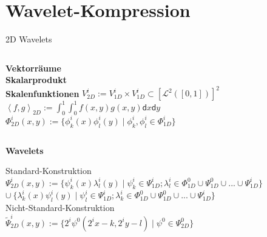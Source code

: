 \section{Wavelet-Kompression}

	\begin{frame}{2D Wavelets}
		\begin{columns}[T,onlytextwidth]
			{\bf Vektorräume}\vspace{3mm}\\
			{\bf Skalarprodukt}\vspace{3mm}\\
			{\bf Skalenfunktionen}
			\vspace{-1mm}
			$V^i_{2D}:= V^i_{1D}\times V^i_{1D}\subset\left[ \mathcal{L}^2([0,1])\right]^2$\vspace{3mm}\\
			$\left\langle f, g\right\rangle _{2D}:=\int_{0}^{1}\int_{0}^{1}f(x,y)g(x,y)\mathsf{d}x\mathsf{d}y$\vspace{3mm}\\
			$\Phi^i_{2D}(x, y):=\{\phi^i_k(x)\phi^i_l(y)\mid \phi^i_k, \phi^i_l\in\Phi^i_{1D} \}$
		\end{columns}\vspace{3mm}\pause
		\begin{center}
				\bf Wavelets\vspace{-5mm}
		\end{center}
		\alert{Standard-Konstruktion}\vspace{1mm}\\
		\hspace{6mm}$\Psi^i_{2D}(x, y):=\{\psi^i_k(x)\lambda^i_l(y)\mid \psi^i_k\in\Psi_{1D}^{i};\lambda^i_l\in\Phi_{1D}^0\cup\Psi_{1D}^0\cup...\cup\Psi_{1D}^{i} \}$\\
		\hspace{23mm}$\cup\ \{\lambda^i_k(x)\psi^i_l(y)\mid \psi^i_l\in\Psi_{1D}^{i};\lambda^i_k\in\Phi_{1D}^0\cup\Psi_{1D}^0\cup...\cup\Psi_{1D}^{i} \}$\vspace{3mm}\\ \pause
		\alert{Nicht-Standard-Konstruktion}\vspace{1mm}\\
		\hspace{6mm}$\tilde\Psi^i_{2D}(x, y):=\{2^i\psi^0(2^ix-k, 2^iy-l)\mid \psi^0 \in \Psi^0_{2D}\}$
	\end{frame}

